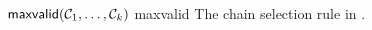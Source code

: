 \begin{cccAlgorithm}
    {$\mathsf{maxvalid}(\mathcal{C}_1, \ldots, \mathcal{C}_k)$}
    {maxvalid}
    {The chain selection rule in \protocFairLedger.}

    \begin{algorithmic}[1]
        
        \EndFor
        
    \end{algorithmic}
\end{cccAlgorithm}